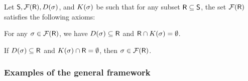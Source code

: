 
\bigskip

\begin{defn}
    Let $\ObjSet, \RegionsSet{\Sample}, \DefSet{\Trap}$, and
    $\KillSet{\Trap}$ be such that for any subset
    $\mathsf{R} \subseteq \mathsf{S}$, the set $\RegionsSet{\Sample}$
    satisfies the following axioms:
    \begin{compactenumi}
        \item {} For any
        $\Trap \in \RegionsSet{\Sample}$, we have
        $\DefSet{\Trap} \subseteq \Sample$ and
        $\Sample \cap \KillSet{\Trap} = \emptyset$.
    
        \item {} If $\DefSet{\Trap} \subseteq \Sample$
        and $\KillSet{ \Trap }\cap \Sample=\emptyset$, then
        $\Trap\in \RegionsSet{\Sample}$.
    \end{compactenumi}
\end{defn}


\subsubsection{Examples of the general framework}

